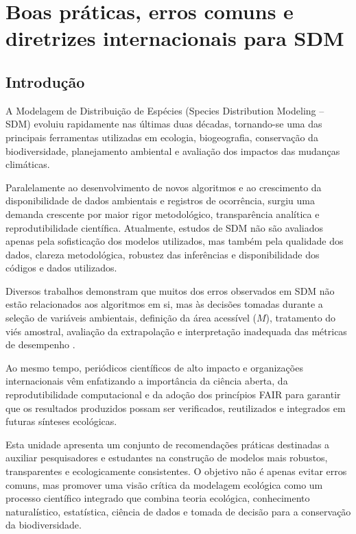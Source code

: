 \chapter{Boas práticas, erros comuns e diretrizes internacionais para SDM}


\section{Introdução}

A Modelagem de Distribuição de Espécies (Species Distribution Modeling -- SDM)
evoluiu rapidamente nas últimas duas décadas, tornando-se uma das principais
ferramentas utilizadas em ecologia, biogeografia, conservação da biodiversidade,
planejamento ambiental e avaliação dos impactos das mudanças climáticas.

Paralelamente ao desenvolvimento de novos algoritmos e ao crescimento da
disponibilidade de dados ambientais e registros de ocorrência, surgiu uma
demanda crescente por maior rigor metodológico, transparência analítica e
reprodutibilidade científica. Atualmente, estudos de SDM não são avaliados
apenas pela sofisticação dos modelos utilizados, mas também pela qualidade dos
dados, clareza metodológica, robustez das inferências e disponibilidade dos
códigos e dados utilizados.

Diversos trabalhos demonstram que muitos dos erros observados em SDM não estão
relacionados aos algoritmos em si, mas às decisões tomadas durante a seleção de
variáveis ambientais, definição da área acessível ($M$), tratamento do viés
amostral, avaliação da extrapolação e interpretação inadequada das métricas de
desempenho \citep{guisan2000predictive, elith2006novel,
	barve2011crucial, guisan2017habitat, zurell2020standard}.

Ao mesmo tempo, periódicos científicos de alto impacto e organizações
internacionais vêm enfatizando a importância da ciência aberta, da
reprodutibilidade computacional e da adoção dos princípios FAIR para garantir
que os resultados produzidos possam ser verificados, reutilizados e integrados
em futuras sínteses ecológicas.

Esta unidade apresenta um conjunto de recomendações práticas destinadas a
auxiliar pesquisadores e estudantes na construção de modelos mais robustos,
transparentes e ecologicamente consistentes. O objetivo não é apenas evitar
erros comuns, mas promover uma visão crítica da modelagem ecológica como um
processo científico integrado que combina teoria ecológica, conhecimento
naturalístico, estatística, ciência de dados e tomada de decisão para a
conservação da biodiversidade.

